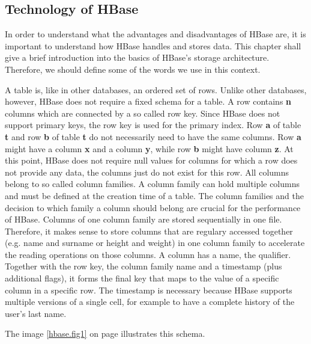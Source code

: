 
\subsection{Technology of HBase}
\label{lblHBaseTechnologies}

In order to understand what the advantages and disadvantages of HBase are, it is important to understand how HBase handles and stores data.
This chapter shall give a brief introduction into the basics of HBase's storage architecture. Therefore, we should define some of the words
we use in this context.

A table is, like in other databases, an ordered set of rows. Unlike other databases, however, HBase does not require a fixed schema for a table.
A row contains \textbf{n} columns which are connected by a so called row key. Since HBase does not support primary keys, the row key is used for the primary
index. Row \textbf{a} of table \textbf{t }and row \textbf{b} of table \textbf{t} do not necessarily need to have the same columns. Row \textbf{a} might have a column \textbf{x} and a column \textbf{y}, while
row \textbf{b} might have column \textbf{z}. At this point, HBase does not require null values for columns for which a row does not provide any data, the columns
just do not exist for this row. \cite{hbase.george.2011}
All columns belong to so called column families. A column family can hold multiple columns and must be defined at the creation time of a table.
The column families and the decision to which family a column should belong are crucial for the performance of HBase. Columns of one column family
are stored sequentially in one file. Therefore, it makes sense to store columns that are regulary accessed together (e.g. name and surname or height and weight)
in one column family to accelerate the reading operations on those columns. \cite{hbase.george.2011}
A column has a name, the qualifier. Together with the row key, the column family name and a timestamp (plus additional flags), it forms the
final key that maps to the value of a specific column in a specific row. The timestamp is necessary because HBase supports multiple versions of a single cell, for example
to have a complete history of the user's last name. \cite{hbase.bertozzi.2012} \cite{hbase.george.2011}

The image \ref{hbase.fig1} on page \pageref{hbase.fig1} illustrates this schema.

